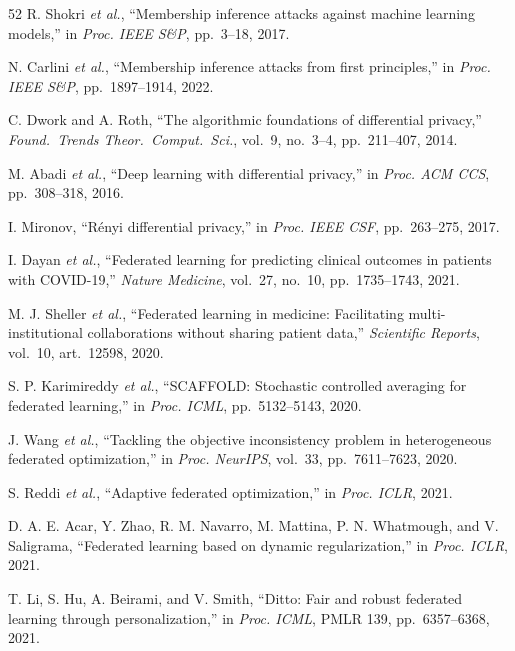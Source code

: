 \documentclass[conference]{IEEEtran}
\begin{document}
\begin{thebibliography}{52}
R. Shokri \textit{et al.}, ``Membership inference attacks against machine learning models,'' in \textit{Proc. IEEE S\&P}, pp.~3--18, 2017.

N. Carlini \textit{et al.}, ``Membership inference attacks from first principles,'' in \textit{Proc. IEEE S\&P}, pp.~1897--1914, 2022.

C. Dwork and A. Roth, ``The algorithmic foundations of differential privacy,'' \textit{Found.~Trends Theor.~Comput.~Sci.}, vol.~9, no.~3--4, pp.~211--407, 2014.

M. Abadi \textit{et al.}, ``Deep learning with differential privacy,'' in \textit{Proc. ACM CCS}, pp.~308--318, 2016.

I. Mironov, ``R\'enyi differential privacy,'' in \textit{Proc. IEEE CSF}, pp.~263--275, 2017.

I. Dayan \textit{et al.}, ``Federated learning for predicting clinical outcomes in patients with COVID-19,'' \textit{Nature Medicine}, vol.~27, no.~10, pp.~1735--1743, 2021.

M. J. Sheller \textit{et al.}, ``Federated learning in medicine: Facilitating multi-institutional collaborations without sharing patient data,'' \textit{Scientific Reports}, vol.~10, art.~12598, 2020.

S. P. Karimireddy \textit{et al.}, ``SCAFFOLD: Stochastic controlled averaging for federated learning,'' in \textit{Proc. ICML}, pp.~5132--5143, 2020.

J. Wang \textit{et al.}, ``Tackling the objective inconsistency problem in heterogeneous federated optimization,'' in \textit{Proc. NeurIPS}, vol.~33, pp.~7611--7623, 2020.

S. Reddi \textit{et al.}, ``Adaptive federated optimization,'' in \textit{Proc. ICLR}, 2021.

D. A. E. Acar, Y. Zhao, R. M. Navarro, M. Mattina, P. N. Whatmough, and V. Saligrama, ``Federated learning based on dynamic regularization,'' in \textit{Proc. ICLR}, 2021.

T. Li, S. Hu, A. Beirami, and V. Smith, ``Ditto: Fair and robust federated learning through personalization,'' in \textit{Proc. ICML}, PMLR 139, pp.~6357--6368, 2021.


\end{thebibliography}
\end{document}
